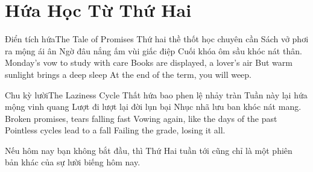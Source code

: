 \chapter{Hứa Học Từ Thứ Hai}

\begin{tutuyetbox}{Điển tích hứa}{The Tale of Promises}
Thứ hai thề thốt học chuyên cần
Sách vở phơi ra mộng ái ân
Ngờ đâu nắng ấm vùi giấc điệp
Cuối khóa ôm sầu khóc nát thân.
\tcblower
Monday's vow to study with care 
Books are displayed, a lover's air 
But warm sunlight brings a deep sleep 
At the end of the term, you will weep.
\end{tutuyetbox}

\begin{tutuyetbox}{Chu kỳ lười}{The Laziness Cycle}
Thất hứa bao phen lệ nhảy tràn
Tuần này lại hứa mộng vinh quang
Lượt đi lượt lại đời lụn bại
Nhục nhã lưu ban khóc nát mang.
\tcblower
Broken promises, tears falling fast 
Vowing again, like the days of the past 
Pointless cycles lead to a fall 
Failing the grade, losing it all.
\end{tutuyetbox}

\begin{ghichu}
Nếu hôm nay bạn không bắt đầu, thì Thứ Hai tuần tới cũng chỉ là một phiên bản khác của sự lười biếng hôm nay.
\end{ghichu}